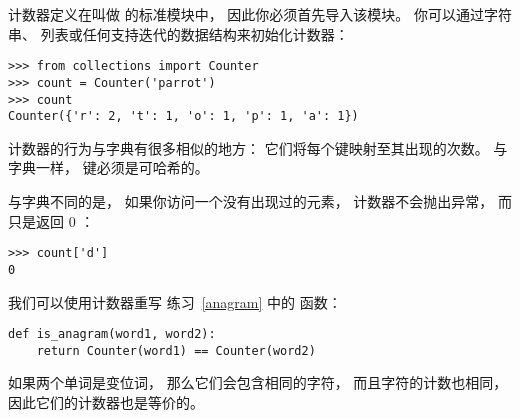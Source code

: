 
计数器定义在叫做  的标准模块中， 因此你必须首先导入该模块。
你可以通过字符串、 列表或任何支持迭代的数据结构来初始化计数器：

\begin{lstlisting}
>>> from collections import Counter
>>> count = Counter('parrot')
>>> count
Counter({'r': 2, 't': 1, 'o': 1, 'p': 1, 'a': 1})
\end{lstlisting}


计数器的行为与字典有很多相似的地方： 它们将每个键映射至其出现的次数。
与字典一样， 键必须是可哈希的。


与字典不同的是， 如果你访问一个没有出现过的元素， 计数器不会抛出异常， 而只是返回 0 ：

\begin{lstlisting}
>>> count['d']
0
\end{lstlisting}


我们可以使用计数器重写 练习~\ref{anagram} 中的  函数：

\begin{lstlisting}
def is_anagram(word1, word2):
    return Counter(word1) == Counter(word2)
\end{lstlisting}


如果两个单词是变位词， 那么它们会包含相同的字符， 而且字符的计数也相同， 因此它们的计数器也是等价的。


